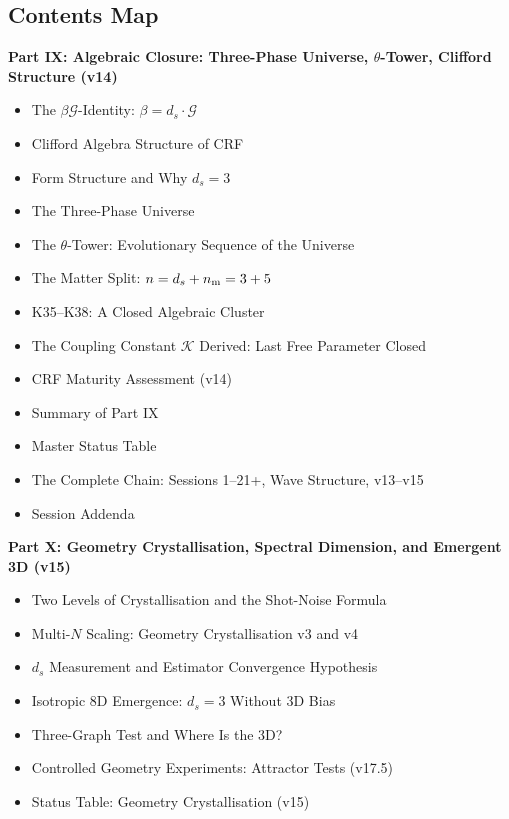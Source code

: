 \documentclass[11pt, a4paper]{article}
\begin{document}
\subsection*{Contents Map}

\begin{contentsbox}[title={Part B --- Part and Section Headers}]
\textbf{Part IX: Algebraic Closure: Three-Phase Universe, $\theta$-Tower, Clifford Structure (v14)}
\begin{itemize}[noitemsep,leftmargin=1.5em]
  \item The $\beta\mathcal{G}$-Identity: $\beta = d_s \cdot \mathcal{G}$
  \item Clifford Algebra Structure of CRF
  \item Form Structure and Why $d_s = 3$
  \item The Three-Phase Universe
  \item The $\theta$-Tower: Evolutionary Sequence of the Universe
  \item The Matter Split: $n = d_s + n_{\rm m} = 3 + 5$
  \item K35--K38: A Closed Algebraic Cluster
  \item The Coupling Constant $\mathcal{K}$ Derived: Last Free Parameter Closed
  \item CRF Maturity Assessment (v14)
  \item Summary of Part IX
  \item Master Status Table
  \item The Complete Chain: Sessions 1--21+, Wave Structure, v13--v15
  \item Session Addenda
\end{itemize}

\textbf{Part X: Geometry Crystallisation, Spectral Dimension, and Emergent 3D (v15)}
\begin{itemize}[noitemsep,leftmargin=1.5em]
  \item Two Levels of Crystallisation and the Shot-Noise Formula
  \item Multi-$N$ Scaling: Geometry Crystallisation v3 and v4
  \item $d_s$ Measurement and Estimator Convergence Hypothesis
  \item Isotropic 8D Emergence: $d_s=3$ Without 3D Bias
  \item Three-Graph Test and Where Is the 3D?
  \item Controlled Geometry Experiments: Attractor Tests (v17.5)
  \item Status Table: Geometry Crystallisation (v15)
\end{itemize}


\end{contentsbox}
\end{document}
